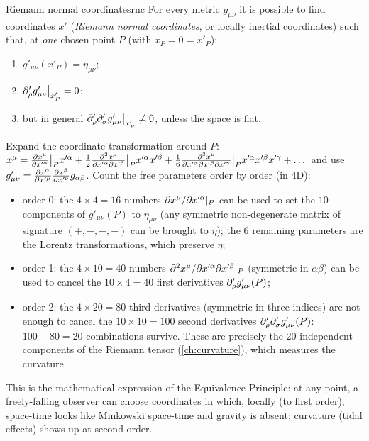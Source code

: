 \begin{theorem}{Riemann normal coordinates}{rnc}
For every metric $g_{\mu\nu}$ it is possible to find coordinates $x'$ (\emph{Riemann normal coordinates}, or locally inertial coordinates) such that, at \emph{one} chosen point $P$ (with $x_P=0=x'_P$):
\begin{enumerate}[nosep]
  \item $g'_{\mu\nu}(x'_P)=\eta_{\mu\nu}$;
  \item $\partial'_\rho g'_{\mu\nu}\big|_{x'_P}=0$;
  \item but in general $\partial'_\rho\partial'_\sigma g'_{\mu\nu}\big|_{x'_P}\neq0$, unless the space is flat.
\end{enumerate}
\end{theorem}
\begin{proofsketch}
Expand the coordinate transformation around $P$: $x^\mu=\frac{\partial x^\mu}{\partial x'^\alpha}\big|_P x'^\alpha+\frac12\frac{\partial^2x^\mu}{\partial x'^\alpha\partial x'^\beta}\big|_P x'^\alpha x'^\beta+\frac16\frac{\partial^3 x^\mu}{\partial x'^\alpha\partial x'^\beta\partial x'^\gamma}\big|_P x'^\alpha x'^\beta x'^\gamma+\dots$ and use $g'_{\mu\nu}=\frac{\partial x^\alpha}{\partial x'^\mu}\frac{\partial x^\beta}{\partial x'^\nu}g_{\alpha\beta}$. Count the free parameters order by order (in 4D):
\begin{itemize}[nosep]
\item order 0: the $4\times4=16$ numbers $\partial x^\mu/\partial x'^\alpha|_P$ can be used to set the $10$ components of $g'_{\mu\nu}(P)$ to $\eta_{\mu\nu}$ (any symmetric non-degenerate matrix of signature $(+,-,-,-)$ can be brought to $\eta$); the $6$ remaining parameters are the Lorentz transformations, which preserve $\eta$;
\item order 1: the $4\times10=40$ numbers $\partial^2x^\mu/\partial x'^\alpha\partial x'^\beta|_P$ (symmetric in $\alpha\beta$) can be used to cancel the $10\times4=40$ first derivatives $\partial'_\rho g'_{\mu\nu}(P)$;
\item order 2: the $4\times20=80$ third derivatives (symmetric in three indices) are not enough to cancel the $10\times10=100$ second derivatives $\partial'_\rho\partial'_\sigma g'_{\mu\nu}(P)$: $100-80=20$ combinations survive. These are precisely the $20$ independent components of the Riemann tensor (\cref{ch:curvature}), which measures the curvature.
\end{itemize}
\end{proofsketch}
This is the mathematical expression of the Equivalence Principle: at any point, a freely-falling observer can choose coordinates in which, locally (to first order), space-time looks like Minkowski space-time and gravity is absent; curvature (tidal effects) shows up at second order.

